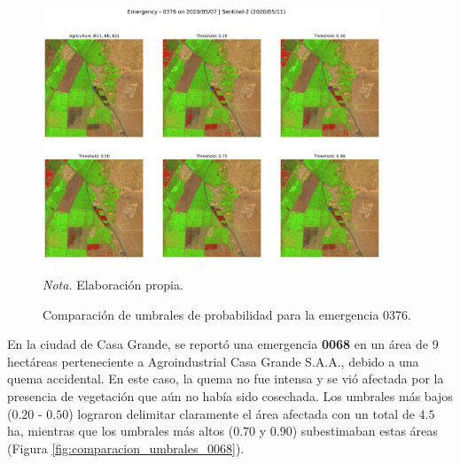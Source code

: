 \begin{figure}[H]
    \centering
    \caption{Comparación de umbrales de probabilidad para la emergencia 0376.}
    \label{fig:comparacion_umbrales_0376}
    \includegraphics[width=0.9\textwidth]{img/7_resultados/0376.png}
    \begin{flushleft}
        \vspace{-\baselineskip}
        \textit{Nota.} Elaboración propia.
        \vspace{-\baselineskip}
    \end{flushleft}
\end{figure}

En la ciudad de Casa Grande, se reportó una emergencia \textbf{0068} en un área de 9 hectáreas 
perteneciente a Agroindustrial Casa Grande S.A.A., debido a una quema accidental. En este caso, 
la quema no fue intensa y se vió afectada por la presencia de vegetación que aún no había sido 
cosechada. Los umbrales más bajos ($0.20$ - $0.50$) lograron delimitar claramente el área afectada
con un total de $4.5$ ha, mientras que los umbrales más altos ($0.70$ y $0.90$) subestimaban estas
áreas (Figura \ref{fig:comparacion_umbrales_0068}). 

